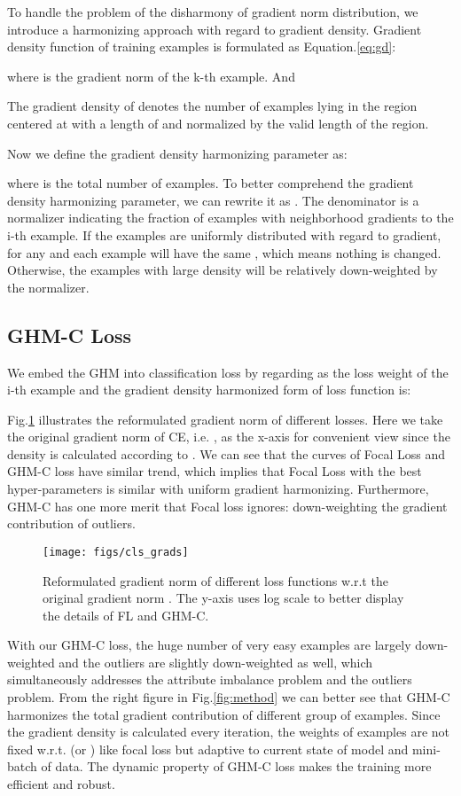 \documentclass[letterpaper]{article} \usepackage{aaai19}  \usepackage{times}  \usepackage{helvet}  \usepackage{courier}  \usepackage{url}  \usepackage{graphicx}  \usepackage{amsmath,amssymb}
\begin{document}
To handle the problem of the disharmony of gradient norm distribution, we introduce a harmonizing approach with regard to gradient density. Gradient density function of training examples is formulated as Equation.\ref{eq:gd}:

where  is the gradient norm of the k-th example. And



The gradient density of  denotes the number of examples lying in the region centered at  with a length of  and normalized by the valid length of the region. 

Now we define the gradient density harmonizing parameter as:

where  is the total number of examples. To better comprehend the gradient density harmonizing parameter, we can rewrite it as . The denominator  is a normalizer indicating the fraction of examples with neighborhood gradients to the i-th example. If the examples are uniformly distributed with regard to gradient,  for any  and each example will have the same , which means nothing is changed. Otherwise, the examples with large density will be relatively down-weighted by the normalizer.


\subsection{GHM-C Loss}

We embed the GHM into classification loss by regarding  as the loss weight of the i-th example and the gradient density harmonized form of loss function is:


Fig.\ref{fig:cls_grads} illustrates the reformulated gradient norm of different losses. Here we take the original gradient norm of CE, i.e. , as the x-axis for convenient view since the density is calculated according to . We can see that the curves of Focal Loss and GHM-C loss have similar trend, which implies that Focal Loss with the best hyper-parameters is similar with uniform gradient harmonizing. Furthermore, GHM-C has one more merit that Focal loss ignores: down-weighting the gradient contribution of outliers.
\begin{figure}[ht]
\centering
\texttt{[image: figs/cls\_grads]}
\caption{Reformulated gradient norm of different loss functions w.r.t the original gradient norm . The y-axis uses log scale to better display the details of FL and GHM-C.}
\label{fig:cls_grads}
\end{figure}

With our GHM-C loss, the huge number of very easy examples are largely down-weighted and the outliers are slightly down-weighted as well, which simultaneously addresses the attribute imbalance problem and the outliers problem. From the right figure in Fig.\ref{fig:method} we can better see that GHM-C harmonizes the total gradient contribution of different group of examples. Since the gradient density is calculated every iteration, the weights of examples are not fixed w.r.t.  (or ) like focal loss but adaptive to current state of model and mini-batch of data. The dynamic property of  GHM-C loss makes the training more efficient and robust.
\end{document}
